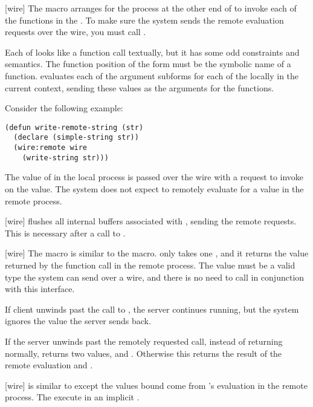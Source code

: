 {[wire]{}
The  macro arranges for the process at the other end of  to
invoke each of the functions in the .  To make sure the system
sends the remote evaluation requests over the wire, you must call
.

Each of  looks like a function call textually, but it has some
odd constraints and semantics.  The function position of the form must be the
symbolic name of a function.   evaluates each of the argument
subforms for each of the  locally in the current context, sending
these values as the arguments for the functions.

Consider the following example:
\begin{verbatim}
(defun write-remote-string (str)
  (declare (simple-string str))
  (wire:remote wire
    (write-string str)))
\end{verbatim}
The value of  in the local process is passed over the wire with a
request to invoke  on the value.  The system does not expect to
remotely evaluate  for a value in the remote process.
\enddefmac

[wire]{}
 flushes all internal buffers associated with ,
sending the remote requests.  This is necessary after a call to .
\enddefun

[wire]{}
The  macro is similar to the  macro.
 only takes one , and it returns the value
returned by the function call in the remote process.  The value must be a valid
type the system can send over a wire, and there is no need to call
 in conjunction with this interface.

If client unwinds past the call to , the server continues
running, but the system ignores the value the server sends back.

If the server unwinds past the remotely requested call, instead of returning
normally,  returns two values, \nil{} and \true.  Otherwise this
returns the result of the remote evaluation and \nil.
\enddefmac

[wire]{
  }
  is similar to  except the values
bound come from 's evaluation in the remote process.  The
 execute in an implicit .

}
